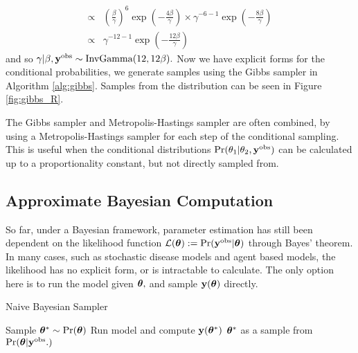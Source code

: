 \begin{example}
\begin{align*}
        \propto &
        \left(\frac{\beta}{\gamma}\right)^{6}
        \exp( -\frac{4\beta}{\gamma})
        \times \gamma^{- 6 - 1}\exp\left(-\frac{8\beta}{\gamma}\right) \\
        \propto & \gamma^{- 12 - 1}
        \exp\left(-\frac{12\beta}{\gamma}\right)
    \end{align*}
    and so
    $\gamma|\beta, \mathbf{y}^{\mathrm{obs}}
        \sim \mathrm{InvGamma}(12, 12\beta).$
    Now we have explicit forms for the conditional probabilities,
    we generate samples using the Gibbs sampler in Algorithm \ref{alg:gibbs}.
    Samples from the distribution can be seen in Figure \ref{fig:gibbs_R}.
\end{example}

The Gibbs sampler and Metropolis-Hastings sampler are often combined, by
using a Metropolis-Hastings sampler for each step of the conditional sampling.
This is useful when the conditional distributions
$\Pr(\theta_1 | \theta_2, \mathbf{y}^{\mathrm{obs}})$ can be calculated up to a proportionality
constant, but not directly sampled from.

\subsection*{Approximate Bayesian Computation}

So far, under a Bayesian framework, parameter estimation has still been
dependent on the likelihood function
$\mathcal{L}(\bm{\theta}) := \Pr(\mathbf{y}^{\mathrm{obs}}|\bm{\theta})$ through Bayes' theorem.
In many cases, such as stochastic disease models and agent based models, the
likelihood has no explicit form, or is intractable to calculate.
The only option here is to run the model given $\bm{\theta},$
and sample $\mathbf{y}(\bm{\theta})$ directly.

\begin{algorithm}[htbp]
    \caption{Naive Bayesian Sampler}
    \label{alg:naive_samp}
    \begin{algorithmic}
        \State Sample $\bm{\theta}^\ast \sim \Pr(\bm{\theta})$
        \State Run model and compute $\mathbf{y}(\bm{\theta}^\ast)$
        \If{$\by(\btheta^\ast) = \by^\obs$}
        \State \Return $\bm{\theta}^\ast$ as a sample from $\Pr(\bm{\theta}|\mathbf{y}^{\mathrm{obs}}.)$
        \EndIf
    \end{algorithmic}
\end{algorithm}

